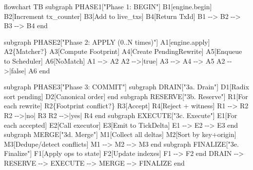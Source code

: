 \documentclass[
]{book}
\newenvironment{Shaded}{}{}
\newcommand{\NormalTok}[1]{#1}
\begin{document}
\begin{Shaded}
\begin{Highlighting}[]
\NormalTok{flowchart TB}
\NormalTok{    subgraph PHASE1["Phase 1: BEGIN"]}
\NormalTok{        B1[engine.begin]}
\NormalTok{        B2[Increment tx\_counter]}
\NormalTok{        B3[Add to live\_txs]}
\NormalTok{        B4[Return TxId]}
\NormalTok{        B1 {-}{-}\textgreater{} B2 {-}{-}\textgreater{} B3 {-}{-}\textgreater{} B4}
\NormalTok{    end}

\NormalTok{    subgraph PHASE2["Phase 2: APPLY (0..N times)"]}
\NormalTok{        A1[engine.apply]}
\NormalTok{        A2\{Matcher?\}}
\NormalTok{        A3[Compute Footprint]}
\NormalTok{        A4[Create PendingRewrite]}
\NormalTok{        A5[Enqueue to Scheduler]}
\NormalTok{        A6[NoMatch]}
\NormalTok{        A1 {-}{-}\textgreater{} A2}
\NormalTok{        A2 {-}{-}\textgreater{}|true| A3 {-}{-}\textgreater{} A4 {-}{-}\textgreater{} A5}
\NormalTok{        A2 {-}{-}\textgreater{}|false| A6}
\NormalTok{    end}

\NormalTok{    subgraph PHASE3["Phase 3: COMMIT"]}
\NormalTok{        subgraph DRAIN["3a. Drain"]}
\NormalTok{            D1[Radix sort pending]}
\NormalTok{            D2[Canonical order]}
\NormalTok{        end}
\NormalTok{        subgraph RESERVE["3b. Reserve"]}
\NormalTok{            R1[For each rewrite]}
\NormalTok{            R2\{Footprint conflict?\}}
\NormalTok{            R3[Accept]}
\NormalTok{            R4[Reject + witness]}
\NormalTok{            R1 {-}{-}\textgreater{} R2}
\NormalTok{            R2 {-}{-}\textgreater{}|no| R3}
\NormalTok{            R2 {-}{-}\textgreater{}|yes| R4}
\NormalTok{        end}
\NormalTok{        subgraph EXECUTE["3c. Execute"]}
\NormalTok{            E1[For each accepted]}
\NormalTok{            E2[Call executor]}
\NormalTok{            E3[Emit to TickDelta]}
\NormalTok{            E1 {-}{-}\textgreater{} E2 {-}{-}\textgreater{} E3}
\NormalTok{        end}
\NormalTok{        subgraph MERGE["3d. Merge"]}
\NormalTok{            M1[Collect all deltas]}
\NormalTok{            M2[Sort by key+origin]}
\NormalTok{            M3[Dedupe/detect conflicts]}
\NormalTok{            M1 {-}{-}\textgreater{} M2 {-}{-}\textgreater{} M3}
\NormalTok{        end}
\NormalTok{        subgraph FINALIZE["3e. Finalize"]}
\NormalTok{            F1[Apply ops to state]}
\NormalTok{            F2[Update indexes]}
\NormalTok{            F1 {-}{-}\textgreater{} F2}
\NormalTok{        end}
\NormalTok{        DRAIN {-}{-}\textgreater{} RESERVE {-}{-}\textgreater{} EXECUTE {-}{-}\textgreater{} MERGE {-}{-}\textgreater{} FINALIZE}
\NormalTok{    end}


\end{Highlighting}
\end{Shaded}
\end{document}
